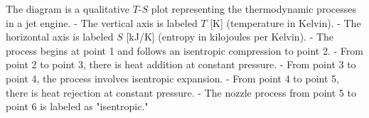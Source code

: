 The diagram is a qualitative \( T \)-\( S \) plot representing the thermodynamic processes in a jet engine.  
- The vertical axis is labeled \( T \) [K] (temperature in Kelvin).  
- The horizontal axis is labeled \( S \) [kJ/K] (entropy in kilojoules per Kelvin).  
- The process begins at point 1 and follows an isentropic compression to point 2.  
- From point 2 to point 3, there is heat addition at constant pressure.  
- From point 3 to point 4, the process involves isentropic expansion.  
- From point 4 to point 5, there is heat rejection at constant pressure.  
- The nozzle process from point 5 to point 6 is labeled as "isentropic."